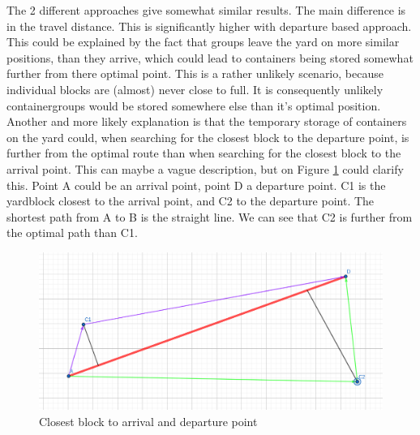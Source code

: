 \documentclass[]{article}
\begin{document}
The 2 different approaches give somewhat similar results. The main difference
is in the travel distance. This is significantly higher with departure based
approach. This could be explained by the fact that groups leave the yard on
more similar positions, than they arrive, which could lead to containers being
stored somewhat further from there optimal point. This is a rather unlikely
scenario, because individual blocks are (almost) never close to full. It is
consequently unlikely containergroups would be stored somewhere else than it's
optimal position. Another and more likely explanation is that the temporary
storage of containers on the yard could, when searching for the closest block
to the departure point, is further from the optimal route than when searching
for the closest block to the arrival point. This can maybe a vague description,
but on Figure \ref{fig:closest} could clarify this. Point A could be an arrival
point, point D a departure point. C1 is the yardblock closest to the arrival
point, and C2 to the departure point. The shortest path from A to B is the
straight line. We can see that C2 is further from the optimal path than C1.
\begin{figure}
	\centering
	\includegraphics[width=0.7\linewidth]{Afbeeldingen/distances.png}
	\caption{Closest block to arrival and departure point}\label{fig:closest}
\end{figure}
\end{document}
